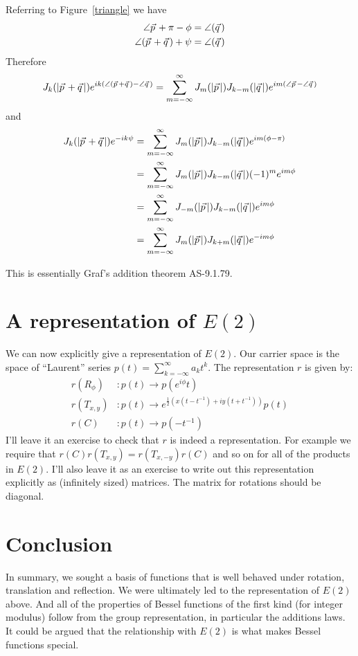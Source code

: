 \documentclass{article}
\newcommand\myvec[1]{\vec{#1}\hspace{0.5mm}}
\begin{document}
Referring to Figure~\ref{triangle} we have
\begin{align*}
\angle\myvec{p}+\pi-\phi & = \angle(\myvec{q}) \\
\angle(\myvec{p}+\myvec{q})+\psi & = \angle(\myvec{q}) 
\end{align*}
Therefore
\[
J_k(|\myvec{p}+\myvec{q}|)e^{ik(\angle(\myvec{p}+\myvec{q})-\angle\myvec{q})} = \sum_{m=-\infty}^\infty J_m(|\myvec{p}|)J_{k-m}(|\myvec{q}|)e^{im(\angle\myvec{p}-\angle\myvec{q})}
\]
and
\begin{align*}
J_k(|\myvec{p}+\myvec{q}|)e^{-ik\psi} & = \sum_{m=-\infty}^\infty J_m(|\myvec{p}|)J_{k-m}(|\myvec{q}|)e^{im(\phi-\pi)} \\
                                 & = \sum_{m=-\infty}^\infty J_m(|\myvec{p}|)J_{k-m}(|\myvec{q}|)(-1)^me^{im\phi} \\
                                 & = \sum_{m=-\infty}^\infty J_{-m}(|\myvec{p}|)J_{k-m}(|\myvec{q}|)e^{im\phi} \\
                                 & = \sum_{m=-\infty}^\infty J_m(|\myvec{p}|)J_{k+m}(|\myvec{q}|)e^{-im\phi}
\end{align*}

This is essentially Graf's addition theorem AS-9.1.79.

\section{A representation of $E(2)$}
We can now explicitly give a representation of $E(2)$.
Our carrier space is the space of ``Laurent'' series $p(t)=\sum_{k=-\infty}^\infty a_kt^k$.
The representation $r$ is given by:
\begin{align*}
r(R_\phi) & : p(t) \rightarrow p(e^{i\phi}t)\\
r(T_{x,y}) & : p(t) \rightarrow e^{\frac{1}{2}(x(t-t^{-1})+iy(t+t^{-1}))}p(t) \\
r(C) & : p(t) \rightarrow p(-t^{-1})
\end{align*}
I'll leave it an exercise to check that $r$ is indeed a representation.
For example we require that $r(C)r(T_{x,y}) = r(T_{x,-y})r(C)$ and so on for all of the products in $E(2)$.
I'll also leave it as an exercise to write out this representation explicitly as (infinitely sized) matrices.
The matrix for rotations should be diagonal.

\section{Conclusion}
In summary, we sought a basis of functions that is well behaved under rotation, translation and reflection.
We were ultimately led to the representation of $E(2)$ above.
And all of the properties of Bessel functions of the first kind (for integer modulus) follow from the group representation, in particular the additions laws.
It could be argued that the relationship with $E(2)$ is what makes Bessel functions special.
\end{document}

